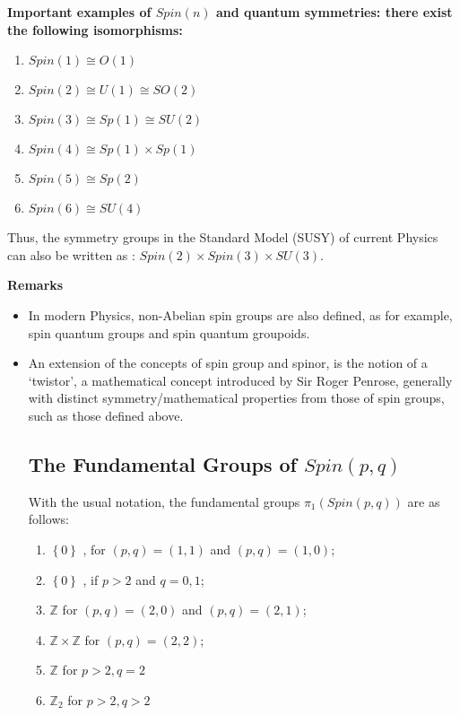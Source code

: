 \documentclass[12pt]{article}
\theoremstyle{plain}
\theoremstyle{definition}
\numberwithin{equation}{section}
\begin{document}
{\bf Important examples of $Spin(n)$ and quantum symmetries: there exist the following isomorphisms:}

\begin{enumerate}
\item $Spin(1) \cong O(1) $  

\item $Spin(2) \cong U(1)\cong SO(2) $

\item $Spin(3) \cong Sp(1)\cong SU(2)$ 

\item $Spin(4) \cong  Sp(1) \times Sp(1)$

\item $Spin(5) \cong Sp(2) $

\item $Spin(6) \cong SU(4) $

\end{enumerate}

Thus, the symmetry groups in the Standard Model (SUSY) of current Physics can also be written as : 
$Spin(2) \times Spin(3) \times SU(3)$. 

{\bf Remarks}
\begin{itemize}
\item In modern Physics, non-Abelian spin groups are also defined, as for example, spin quantum groups
and spin quantum groupoids.

\item An extension of the concepts of spin group and spinor, is the notion of a `twistor', 
a mathematical concept introduced by Sir Roger Penrose, generally with distinct symmetry/mathematical properties
from those of spin groups, such as those defined above.

\subsection{The Fundamental Groups of $Spin(p,q)$}

With the usual notation, the fundamental groups $\pi_1(Spin(p,q))$ are as follows:

\begin{enumerate}

\item $\left\{0\right\}$ , for $(p,q)= (1,1)$ and $(p,q)= (1,0)$;

\item $\left\{0\right\}$ , if $p > 2$ and $q = 0,1$;

\item $\mathbb{Z}$  for $(p,q)= (2,0)$ and $(p,q)= (2,1)$;

\item $\mathbb{Z} \times \mathbb{Z}$ for $(p,q)= (2,2)$;

\item $\mathbb{Z}$ for $ p>2, q =2 $ 

\item $\mathbb{Z}_2$ for $ p>2, q >2 $ 

\end{enumerate}




\end{itemize}
\end{document}

